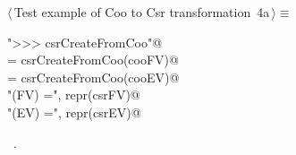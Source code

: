 \documentclass[11pt,oneside]{article}	%
\begin{document}
\begin{flushleft} \small
\begin{minipage}{\linewidth} \label{scrap5}
\protect{}$\langle\,$Test example of Coo to Csr transformation\nobreak\ {\footnotesize 4a}$\,\rangle\equiv$
\vspace{-1ex}
\begin{list}{}{} \item
\mbox{}\verb@print "\n>>> csrCreateFromCoo"@\\
\mbox{}\verb@csrFV = csrCreateFromCoo(cooFV)@\\
\mbox{}\verb@csrEV = csrCreateFromCoo(cooEV)@\\
\mbox{}\verb@print "\ncsr(FV) =\n", repr(csrFV)@\\
\mbox{}\verb@print "\ncsr(EV) =\n", repr(csrEV)@\\
\mbox{}\verb@@{\NWsep}
\end{list}
\vspace{-1ex}
\footnotesize\addtolength{\baselineskip}{-1ex}
\begin{list}{}{\setlength{\itemsep}{-\parsep}\setlength{\itemindent}{-\leftmargin}}
\item \NWtxtMacroRefIn\ .
\end{list}
\end{minipage}\\[4ex]
\end{flushleft}
\end{document}
